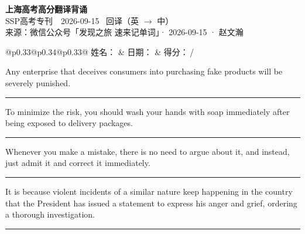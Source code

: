 \documentclass[11pt,a4paper]{article}
\newcommand{\num}[1]{\makebox[1.9em][r]{#1.}\hspace{0.3em}}
\newcommand{\wline}{\noindent\rule{\linewidth}{0.4pt}}
\begin{document}
\pagestyle{plain}
\begin{center}
{\LARGE\bfseries 上海高考高分翻译背诵 }\\[0.25em]
{\large SSP高考专刊　2026-09-15 \quad\ 回译（英 $\to$ 中）}\\[0.35em]
{\footnotesize 来源：微信公众号「发现之旅 速来记单词」· 2026-09-15 · 赵文瀚}
\end{center}

\vspace{0.4em}
\noindent\begin{tabular}{@{}p{0.33\textwidth}@{}p{0.34\textwidth}@{}p{0.33\textwidth}@{}}
姓名：\underline{\hspace{2.0cm}} & 日期：\underline{\hspace{2.0cm}} & 得分：\underline{\hspace{1.4cm}}\,/ \\
\end{tabular}

\vspace{0.5em}

\vspace{0.8em}
\num{1}Any enterprise that deceives consumers into purchasing fake products will be severely punished.

\vspace{0.25em}

\wline

\num{2}To minimize the risk, you should wash your hands with soap immediately after being exposed to delivery packages.

\vspace{0.25em}

\wline

\num{3}Whenever you make a mistake, there is no need to argue about it, and instead, just admit it and correct it immediately.

\vspace{0.25em}

\wline

\num{4}It is because violent incidents of a similar nature keep happening in the country that the President has issued a statement to express his anger and grief, ordering a thorough investigation.

\vspace{0.25em}

\wline
\end{document}

